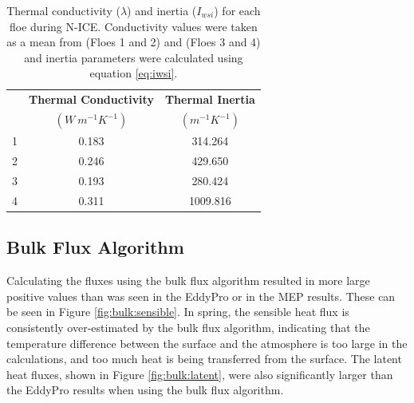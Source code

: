 \begin{table}[t]
\centering
\footnotesize
\doublespacing
{
\begin{tabular}{| c | c | c |}
 \hline
\rowcolor[HTML]{F3F3F3}  & \textbf{Thermal Conductivity} & \textbf{Thermal Inertia}\\
 \rowcolor[HTML]{F3F3F3}\multirow{-2}{*}{\textbf{Floe}} & $(W~m^{-1}K^{-1})$ & $(m^{-1}K^{-1})$  \\
  \hline
 1 & 0.183 & 314.264 \\
 2 & 0.246 & 429.650 \\ 
 3 & 0.193 & 280.424 \\
 4 & 0.311 & 1009.816 \\
  \hline
\end{tabular}}
\caption[Thermal conductivity and inertia.]{Thermal conductivity ($\lambda$) and inertia ($I_{wsi}$) for each floe during N-ICE. Conductivity values were taken as a mean from \citet{merkouriadi:2017} (Floes 1 and 2) and \citet{gallet:2017} (Floes 3 and 4) and inertia parameters were calculated using equation \ref{eq:iwsi}.}
\label{tab:thermal}
\end{table}

\subsection{Bulk Flux Algorithm}
Calculating the fluxes using the bulk flux algorithm resulted in more large positive values than was seen in the EddyPro or in the MEP results. These can be seen in Figure \ref{fig:bulk:sensible}. In spring, the sensible heat flux is consistently over-estimated by the bulk flux algorithm, indicating that the temperature difference between the surface and the atmosphere is too large in the calculations, and too much heat is being transferred from the surface. The latent heat fluxes, shown in Figure \ref{fig:bulk:latent}, were also significantly larger than the EddyPro results when using the bulk flux algorithm. 

